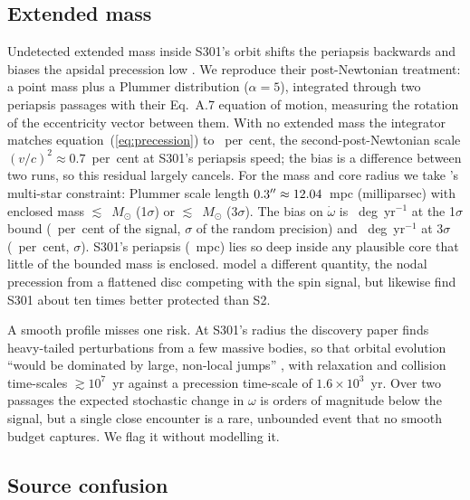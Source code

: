 \documentclass{aastex701}
\begin{document}
\subsection{Extended mass}
\label{sec:extmass}

Undetected extended mass inside S301's orbit shifts the periapsis backwards and biases the apsidal precession low \citep{rubilar2001}. We reproduce their post-Newtonian treatment: a point mass plus a Plummer distribution ($\alpha=5$), integrated through two periapsis passages with their Eq.~A.7 equation of motion, measuring the rotation of the eccentricity vector between them. With no extended mass the integrator matches equation~(\ref{eq:precession}) to \extmassPointmassAgreementPct{}~per~cent, the second-post-Newtonian scale $(v/c)^2\approx0.7$~per~cent at S301's periapsis speed; the bias is a difference between two runs, so this residual largely cancels. For the mass and core radius we take \citet{gravity2022massdist}'s multi-star constraint: Plummer scale length $0.3''\approx12.04{}$~mpc (milliparsec) with enclosed mass $\lesssim$\extmassMExtOneMsun{}~$M_\odot$ (1$\sigma$) or $\lesssim$\extmassMExtThreeMsun{}~$M_\odot$ (3$\sigma$). The bias on $\dot\omega$ is \extmassBiasRateOne{}~deg~yr$^{-1}$ at the 1$\sigma$ bound (\extmassBiasPctOne{}~per~cent of the signal, \extmassBiasNsigmaOne{}$\sigma$ of the random precision) and \extmassBiasRateThree{}~deg~yr$^{-1}$ at 3$\sigma$ (\extmassBiasPctThree{}~per~cent, \extmassBiasNsigmaThree{}$\sigma$). S301's periapsis (\extmassRpMpc{}~mpc) lies so deep inside any plausible core that little of the bounded mass is enclosed. \citet{piran2026} model a different quantity, the nodal precession from a flattened disc competing with the spin signal, but likewise find S301 about ten times better protected than S2.

A smooth profile misses one risk. At S301's radius the discovery paper finds heavy-tailed perturbations from a few massive bodies, so that orbital evolution ``would be dominated by large, non-local jumps'' \citep[Methods]{gravity2026}, with relaxation and collision time-scales $\gtrsim 10^7$~yr against a precession time-scale of $1.6\times10^3$~yr. Over two passages the expected stochastic change in $\omega$ is orders of magnitude below the signal, but a single close encounter is a rare, unbounded event that no smooth budget captures. We flag it without modelling it.

\subsection{Source confusion}
\label{sec:confusion}
\end{document}
